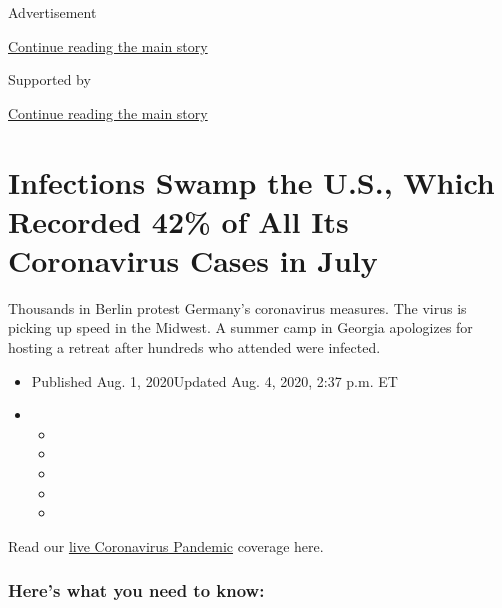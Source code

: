 Advertisement

\protect\hyperlink{after-top}{Continue reading the main story}

Supported by

\protect\hyperlink{after-sponsor}{Continue reading the main story}

\hypertarget{infections-swamp-the-us-which-recorded-42-of-all-its-coronavirus-cases-in-july}{%
\section{Infections Swamp the U.S., Which Recorded 42\% of All Its
Coronavirus Cases in
July}\label{infections-swamp-the-us-which-recorded-42-of-all-its-coronavirus-cases-in-july}}

Thousands in Berlin protest Germany's coronavirus measures. The virus is
picking up speed in the Midwest. A summer camp in Georgia apologizes for
hosting a retreat after hundreds who attended were infected.

\begin{itemize}
\item
  Published Aug. 1, 2020Updated Aug. 4, 2020, 2:37 p.m. ET
\item
  \begin{itemize}
  \item
  \item
  \item
  \item
  \item
  \end{itemize}
\end{itemize}

Read our
\href{https://www.nytimes.com/2020/08/04/world/coronavirus-cases.html}{live
Coronavirus Pandemic} coverage here.

\hypertarget{heres-what-you-need-to-know}{%
\subsubsection{Here's what you need to
know:}\label{heres-what-you-need-to-know}}

